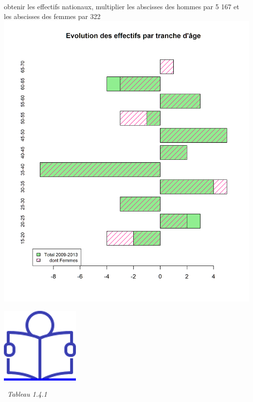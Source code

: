 obtenir les effectifs nationaux, multiplier les abscisses des hommes par
5 167 et les abscisses des femmes par 322\newpage
\includegraphics{altair_files/figure-latex/unnamed-chunk-23-3.png}

\href{../Docs/Notices/fiche_3.odt}{\includegraphics{icones/Notice.png}}

\newpage

~\emph{Tableau 1.4.1}

